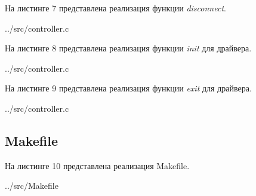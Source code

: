 \clearpage

На листинге 7 представлена реализация функции \textit{disconnect}.
\FloatBarrier
\begin{lstinputlisting}[language=C, caption=Реализация функции disconnect, linerange = {208-221},
	basicstyle=\footnotesize\ttfamily, frame=single, breaklines=true]{../src/controller.c}
\end{lstinputlisting}
\FloatBarrier

\clearpage

На листинге 8 представлена реализация функции \textit{init} для драйвера.
\FloatBarrier
\begin{lstinputlisting}[language=C, caption=Реализация функции init, linerange = {260-295},
	basicstyle=\footnotesize\ttfamily, frame=single, breaklines=true]{../src/controller.c}
\end{lstinputlisting}
\FloatBarrier

\clearpage

На листинге 9 представлена реализация функции \textit{exit} для драйвера.
\FloatBarrier
\begin{lstinputlisting}[language=C, caption=Реализация функции exit, linerange = {297-304},
	basicstyle=\footnotesize\ttfamily, frame=single, breaklines=true]{../src/controller.c}
\end{lstinputlisting}
\FloatBarrier

\subsection{Makefile}
На листинге 10 представлена реализация Makefile.
\FloatBarrier
\begin{lstinputlisting}[language=C, caption=Makefile, linerange = {},
	basicstyle=\footnotesize\ttfamily, frame=single, breaklines=true]{../src/Makefile}
\end{lstinputlisting}
\FloatBarrier